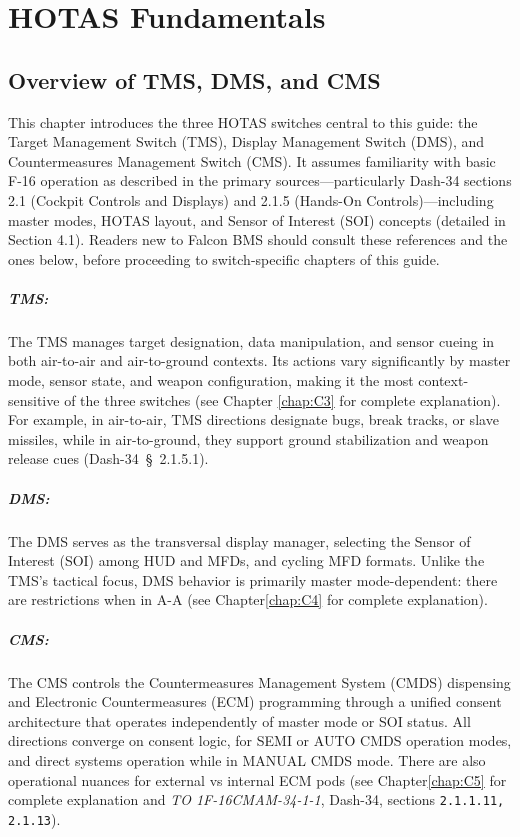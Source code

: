 \documentclass[11pt, a4paper, twoside]{report}
\providecommand{\dashref}[1]{Dash-34~\S~#1}
\providecommand{\dashrefs}[1]{\textit{TO 1F-16CMAM-34-1-1}, Dash-34, sections \texttt{#1}}
\begin{document}
\chapter{HOTAS Fundamentals}
\label{chap:C2}

\section{Overview of TMS, DMS, and CMS}
\label{sec:C2-S1}
This chapter introduces the three HOTAS switches central to this guide: the Target Management Switch (TMS), Display Management Switch (DMS), and Countermeasures Management Switch (CMS). It assumes familiarity with basic F-16 operation as described in the primary sources—particularly Dash-34 sections 2.1 (Cockpit Controls and Displays) and 2.1.5 (Hands-On Controls)—including master modes, HOTAS layout, and Sensor of Interest (SOI) concepts (detailed in Section 4.1). Readers new to Falcon BMS should consult these references and the ones below, before proceeding to switch-specific chapters of this guide.

\paragraph{TMS:}The TMS manages target designation, data manipulation, and sensor cueing in both air-to-air and air-to-ground contexts. Its actions vary significantly by master mode, sensor state, and weapon configuration, making it the most context-sensitive of the three switches (see Chapter \ref{chap:C3} for complete explanation). For example, in air-to-air, TMS directions designate bugs, break tracks, or slave missiles, while in air-to-ground, they support ground stabilization and weapon release cues (\dashref{2.1.5.1}).

\paragraph{DMS:}The DMS serves as the transversal display manager, selecting the Sensor of Interest (SOI) among HUD and MFDs, and cycling MFD formats. Unlike the TMS's tactical focus, DMS behavior is primarily master mode-dependent: there are restrictions when in A-A (see Chapter\ref{chap:C4} for complete explanation).

\paragraph{CMS:}The CMS controls the Countermeasures Management System (CMDS) dispensing and Electronic Countermeasures (ECM) programming through a unified consent architecture that operates independently of master mode or SOI status. All directions converge on consent logic, for SEMI or AUTO CMDS operation modes, and direct systems operation while in MANUAL CMDS mode. There are also operational nuances for external vs internal ECM pods (see Chapter\ref{chap:C5} for complete explanation and \dashrefs{2.1.1.11, 2.1.13}).
\end{document}
